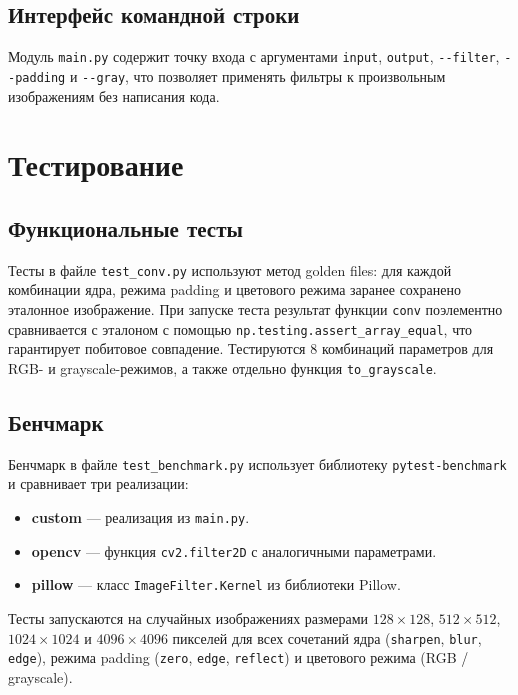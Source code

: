 \documentclass[a4paper]{article}
\begin{document}
\subsection{Интерфейс командной строки}

Модуль \verb|main.py| содержит точку входа с аргументами \verb|input|, \verb|output|, \verb|--filter|, \verb|--padding| и \verb|--gray|, что позволяет применять фильтры к произвольным изображениям без написания кода.

\section{Тестирование}

\subsection{Функциональные тесты}

Тесты в файле \verb|test_conv.py| используют метод golden files: для каждой комбинации ядра, режима padding и цветового режима заранее сохранено эталонное изображение. При запуске теста результат функции \verb|conv| поэлементно сравнивается с эталоном с помощью \verb|np.testing.assert_array_equal|, что гарантирует побитовое совпадение. Тестируются 8 комбинаций параметров для RGB- и grayscale-режимов, а также отдельно функция \verb|to_grayscale|.

\subsection{Бенчмарк}

Бенчмарк в файле \verb|test_benchmark.py| использует библиотеку \verb|pytest-benchmark| и сравнивает три реализации:
\begin{itemize}[leftmargin=3.5em, topsep=0pt]
    \item \textbf{custom} --- реализация из \verb|main.py|.
    \item \textbf{opencv} --- функция \verb|cv2.filter2D| с аналогичными параметрами.
    \item \textbf{pillow} --- класс \verb|ImageFilter.Kernel| из библиотеки Pillow.
\end{itemize}
Тесты запускаются на случайных изображениях размерами $128\times128$, $512\times512$, $1024\times1024$ и $4096\times4096$ пикселей для всех сочетаний ядра (\verb|sharpen|, \verb|blur|, \verb|edge|), режима padding (\verb|zero|, \verb|edge|, \verb|reflect|) и цветового режима (RGB / grayscale).
\end{document}
